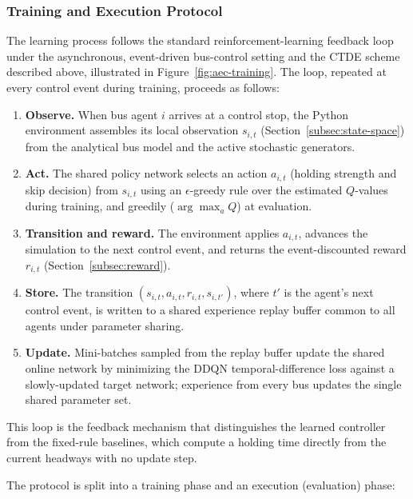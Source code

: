 \subsubsection{Training and Execution Protocol}

The learning process follows the standard reinforcement-learning feedback loop under the asynchronous, event-driven bus-control setting and the CTDE scheme described above, illustrated in Figure~\ref{fig:aec-training}. The loop, repeated at every control event during training, proceeds as follows:

\begin{enumerate}
\item \textbf{Observe.} When bus agent $i$ arrives at a control stop, the Python environment assembles its local observation $s_{i,t}$ (Section~\ref{subsec:state-space}) from the analytical bus model and the active stochastic generators.
\item \textbf{Act.} The shared policy network selects an action $a_{i,t}$ (holding strength and skip decision) from $s_{i,t}$ using an $\epsilon$-greedy rule over the estimated $Q$-values during training, and greedily ($\arg\max_a Q$) at evaluation.
\item \textbf{Transition and reward.} The environment applies $a_{i,t}$, advances the simulation to the next control event, and returns the event-discounted reward $r_{i,t}$ (Section~\ref{subsec:reward}).
\item \textbf{Store.} The transition $(s_{i,t}, a_{i,t}, r_{i,t}, s_{i,t'})$, where $t'$ is the agent's next control event, is written to a shared experience replay buffer common to all agents under parameter sharing.
\item \textbf{Update.} Mini-batches sampled from the replay buffer update the shared online network by minimizing the DDQN temporal-difference loss against a slowly-updated target network; experience from every bus updates the single shared parameter set.
\end{enumerate}

This loop is the feedback mechanism that distinguishes the learned controller from the fixed-rule baselines, which compute a holding time directly from the current headways with no update step.

The protocol is split into a training phase and an execution (evaluation) phase:

